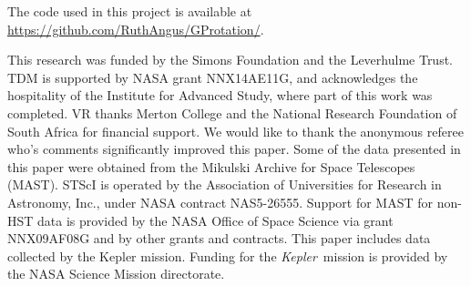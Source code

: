 \documentclass[a4paper,fleqn,usenatbib,useAMS]{mnras}
\newcommand{\Kepler}{{\it Kepler}}
\begin{document}
The code used in this project is available at
\url{https://github.com/RuthAngus/GProtation/}.

This research was funded by the Simons Foundation and the Leverhulme Trust.
TDM is supported by NASA grant NNX14AE11G, and acknowledges the
hospitality of the Institute for Advanced Study,
where part of this work was completed.
VR thanks Merton College and the National Research Foundation of South Africa
for financial support.
We would like to thank the anonymous referee who's comments significantly
improved this paper.
Some of the data presented in this paper were obtained from the Mikulski
Archive for Space Telescopes (MAST).
STScI is operated by the Association of Universities for Research in
Astronomy, Inc., under NASA contract NAS5-26555.
Support for MAST for non-HST data is provided by the NASA Office of Space
Science via grant NNX09AF08G and by other grants and contracts.
This paper includes data collected by the Kepler mission. Funding for the
\Kepler\ mission is provided by the NASA Science Mission directorate.

% 


\end{document}
